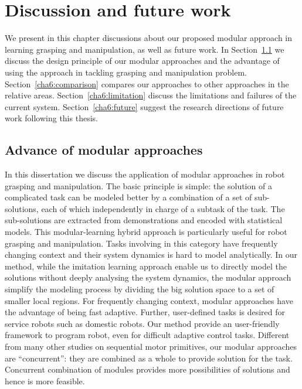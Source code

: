 \chapter{Discussion and future work}
\label{cha6}
We present in this chapter discussions about our proposed modular approach in learning grasping and manipulation, as well as future work. In Section~\ref{cha6:advantage} we discuss the design principle of our modular approaches and the advantage of using the approach in tackling grasping and manipulation problem. Section~\ref{cha6:comparison} compares our approaches to other approaches in the relative areas. Section~\ref{cha6:limitation} discuss the limitations and failures of the current system. Section~\ref{cha6:future} suggest the research directions of future work following this thesis.


\section{Advance of modular approaches}
\label{cha6:advantage}
In this dissertation we discuss the application of modular approaches in robot grasping and manipulation. The basic principle is simple: the solution of a complicated task can be modeled better by a combination of a set of sub-solutions, each of which independently in charge of a subtask of the task. The sub-solutions are extracted from demonstrations and encoded with statistical models.
This modular-learning hybrid approach is particularly useful for robot grasping and manipulation. Tasks involving in this category have frequently changing context and their system dynamics is hard to model analytically.
In our method, while the imitation learning approach enable us to directly model the solutions without deeply analysing the system dynamics, the modular approach simplify the modeling process by dividing the big solution space to a set of smaller local regions. For frequently changing context, modular approaches have the advantage of being fast adaptive. Further, user-defined tasks is desired for service robots such as domestic robots. Our method provide an user-friendly framework to program robot, even for difficult adaptive control tasks. Different from many other studies on sequential motor primitives, our modular approaches are ``concurrent'': they are combined as a whole to provide solution for the task. Concurrent combination of modules provides more possibilities of solutions and hence is more feasible.



